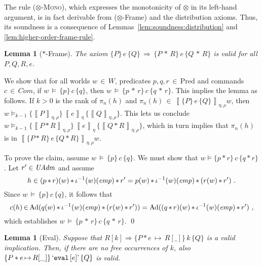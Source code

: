 \documentclass{LMCS}
\newtheorem{lemma}[theorem]{Lemma}
\theoremstyle{remark}
\newcommand{\Com}{\ensuremath{\mathit{Com}}\xspace}
\newcommand{\QUOTE}[1]{\textnormal{`\ensuremath{#1}'}}
\newcommand{\UNQUOTE}[1]{\SYN{eval}\,{#1}}
\newcommand{\SYN}[1]{\ensuremath{\texttt{#1}}}
\newcommand{\triple}[3]{{\ensuremath{\!\left.\{ #1 \}\, #2\, \{  #3 \}\!\right.}}}
\newcommand{\pointsto}{\ensuremath{\mapsto}}
\newcommand{\wemp}{\textnormal{\textit{emp}}}
\newcommand{\den}[1]{\left\llbracket #1
  \right\rrbracket}
\newcommand{\Pred}{\ensuremath{\mathrm{Pred}}\xspace}
\newcommand{\W}{\ensuremath{W}}
\newcommand{\UNFOLD}{\ensuremath{\iota^{-1}}}
\begin{document}
The rule (\textsc{$\otimes$-Mono}), which expresses the monotonicity of $\otimes$ in its left-hand argument, is in fact derivable from ($\otimes$-Frame) and the distribution axioms. Thus, its soundness is a consequence of Lemmas~\ref{lem:soundness:distribution} and \ref{lem:higher-order-frame-rule}.


\begin{lemma}[$*$-Frame]
\label{lem:star-frame}
The axiom $\triple{P}{e}{Q} \,{\Rightarrow}\, \triple{P\,{*}\,R}{e}{Q\,{*}\,R}$ is valid 
for all $P,Q,R,e$.
\end{lemma}
\proof
We show that for all  worlds $w \,{\in}\, \W$,  predicates $p,q,r \,{\in}\, \Pred$ and commands  $c\,{\in}\,\Com$,
if $w\,{\models}\,\triple pcq$, then $w\,{\models}\,\triple{p\,{*}\,r}{c}{q\,{*}\,r}$. This implies the lemma as follows. If 
$k>0$ is the rank of $\pi_n(h)$ and
$\pi_n(h) \,{\in}\, \den{\triple{P}{e}{Q}}_{\eta,\rho}w$, 
 then $w\models_{k-1} \triple {\den{P}_{\eta,\rho}}{\den{e}_\eta}{\den{Q}_{\eta,\rho}}$.
This lets us conclude $w\models_{k-1}\triple {\den{P*R}_{\eta,\rho}}{\den{e}_\eta}{\den{Q*R}_{\eta,\rho}}$,
which in turn implies that $\pi_n(h)$ is in 
$\den{\triple{P*R}{e}{Q*R}}_{\eta,\rho}w$.

To prove the claim, assume $w\,{\models}\,\triple pcq$. We must show that $w\models\triple{p*r}{c}{q*r}$.
Let $r'\in\mathit{UAdm}$ and 
assume 
\[
h\in (p \,{*}\, r)(w) \,{*}\,\UNFOLD(w)(\wemp) \,{*}\, r' 
= p(w)\,{*}\,\UNFOLD(w)(\wemp) \,{*}\, (r(w)\,{*}\,r')\ .
\] 
Since  $w\,{\models}\,\triple pcq$, it follows that 
\[
c(h)\,{\in}\, \DCl(q(w)\,{*}\,\UNFOLD(w)(\wemp) \,{*}\, (r(w)\,{*}\,r')) 
= \DCl((q\,{*}\,r)(w)\,{*}\,\UNFOLD(w)(\wemp) \,{*}\, r')\ ,
\] 
which establishes $w\,{\models}\,\triple{p\,{*}\,r}{c}{q\,{*}\,r}$.  \qed


\begin{lemma}[Eval] 
\label{lem:Eval}
Suppose that  $R[k] \Rightarrow \triple{P*e\,{\pointsto}\,R[\_]}{k}{Q}$ is a valid implication. 
Then, if there are no free occurrences of $k$, also  $\triple{P*e\,{\pointsto}\,R[\_]}{\QUOTE{\UNQUOTE{[e]}}}{Q}$ is valid. 
\end{lemma}
\end{document}
